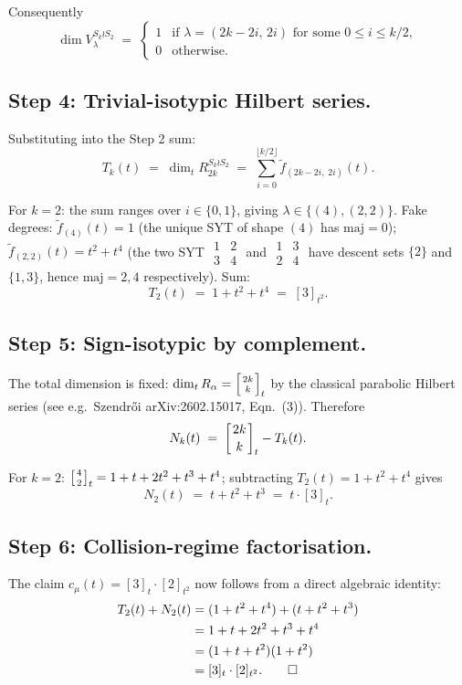 \documentclass[11pt]{article}
\theoremstyle{remark}
\newcommand{\fdeg}{\widetilde{f}}
\newcommand{\qbinom}[2]{\left[{#1 \atop #2}\right]}
\begin{document}
Consequently
\[
\dim V_\lambda^{S_k \wr S_2} \;=\;
\begin{cases}
1 & \text{if } \lambda = (2k-2i,\, 2i) \text{ for some } 0 \leq i \leq k/2, \\
0 & \text{otherwise.}
\end{cases}
\]

\subsection*{Step 4: Trivial-isotypic Hilbert series.}

Substituting into the Step 2 sum:
\[
T_k(t) \;=\; \dim_t R_{2k}^{S_k \wr S_2}
\;=\; \sum_{i=0}^{\lfloor k/2 \rfloor} \fdeg_{(2k-2i,\; 2i)}(t).
\]

For $k = 2$: the sum ranges over $i \in \{0, 1\}$, giving
$\lambda \in \{(4), (2,2)\}$. Fake degrees:
$\fdeg_{(4)}(t) = 1$ (the unique SYT of shape $(4)$ has $\mathrm{maj} = 0$);
$\fdeg_{(2,2)}(t) = t^2 + t^4$ (the two SYT
$\begin{smallmatrix}1&2\\3&4\end{smallmatrix}$ and
$\begin{smallmatrix}1&3\\2&4\end{smallmatrix}$
have descent sets $\{2\}$ and $\{1,3\}$, hence $\mathrm{maj} = 2, 4$
respectively). Sum:
\[
T_2(t) \;=\; 1 + t^2 + t^4 \;=\; [3]_{t^2}.
\]

\subsection*{Step 5: Sign-isotypic by complement.}

The total dimension is fixed:
$\dim_t R_\alpha = \qbinom{2k}{k}_t$ by the classical parabolic Hilbert
series (see e.g.\ Szendr\H oi arXiv:2602.15017, Eqn.\ (3)). Therefore
\[
N_k(t) \;=\; \qbinom{2k}{k}_t - T_k(t).
\]

For $k = 2$: $\qbinom{4}{2}_t = 1 + t + 2t^2 + t^3 + t^4$; subtracting
$T_2(t) = 1 + t^2 + t^4$ gives
\[
N_2(t) \;=\; t + t^2 + t^3 \;=\; t \cdot [3]_t.
\]

\subsection*{Step 6: Collision-regime factorisation.}

The claim $c_\mu(t) = [3]_t \cdot [2]_{t^2}$ now follows from a direct
algebraic identity:
\begin{align*}
T_2(t) + N_2(t)
&= (1 + t^2 + t^4) + (t + t^2 + t^3) \\
&= 1 + t + 2t^2 + t^3 + t^4 \\
&= (1 + t + t^2)(1 + t^2) \\
&= [3]_t \cdot [2]_{t^2}. \qed
\end{align*}
\end{document}
